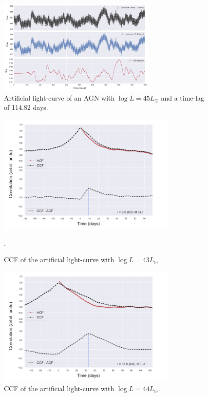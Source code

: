 \documentclass[letterpaper, oneside]{article}
\begin{document}
\begin{figure}[h]
	\centering
	\includegraphics[width=0.7\textwidth]{../lc_plots/art_lcs_logL45.pdf}
	\caption{Artificial light-curve of an AGN with $\log L = 45 L_{\odot}$ and a time-lag of 114.82 days.}
	\label{fig:art_lcs_L45}
\end{figure}


\begin{figure}[h]
	\centering
	\includegraphics[width=0.8\textwidth]{../CCF_plots/x_y_bands_43_final.pdf}
	\caption{CCF of the artificial light-curve with $\log L = 43 L_{\odot}$}.
	\label{fig:ccf_art_lcs_L43}
\end{figure}

\begin{figure}[h]
	\centering
	\includegraphics[width=0.8\textwidth]{../CCF_plots/x_y_bands_44_final.pdf}
	\caption{CCF of the artificial light-curve with $\log L = 44 L_{\odot}$.}
	\label{fig:ccf_art_lcs_L44}
\end{figure}
\end{document}
